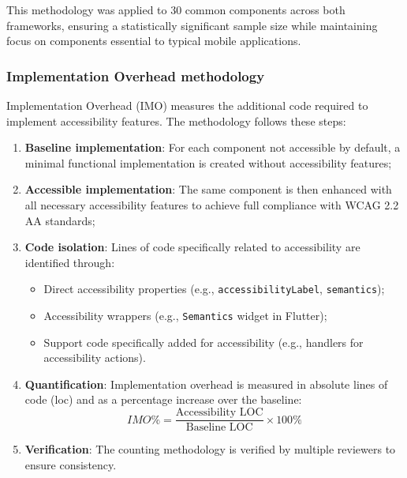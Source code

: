 This methodology was applied to 30 common components across both frameworks, ensuring a statistically significant sample size while maintaining focus on components essential to typical mobile applications.

\subsubsection{Implementation Overhead methodology}
\label{subsubsec:io-methodology}

Implementation Overhead (IMO) measures the additional code required to implement accessibility features. The methodology follows these steps:

\begin{enumerate}
    \item \textbf{Baseline implementation}: For each component not accessible by default, a minimal functional implementation is created without accessibility features;
    
    \item \textbf{Accessible implementation}: The same component is then enhanced with all necessary accessibility features to achieve full compliance with WCAG 2.2 AA standards;
    
    \item \textbf{Code isolation}: Lines of code specifically related to accessibility are identified through:
    \begin{itemize}
        \item Direct accessibility properties (e.g., \texttt{accessibilityLabel}, \texttt{semantics});
        \item Accessibility wrappers (e.g., \texttt{Semantics} widget in Flutter);
        \item Support code specifically added for accessibility (e.g., handlers for accessibility actions).
    \end{itemize}
    
    \item \textbf{Quantification}: Implementation overhead is measured in absolute lines of code (\acrshort{loc}) and as a percentage increase over the baseline:
    \begin{equation}
    IMO\% = \frac{\text{Accessibility LOC}}{\text{Baseline LOC}} \times 100\%
    \end{equation}
    
    \item \textbf{Verification}: The counting methodology is verified by multiple reviewers to ensure consistency.
\end{enumerate}


